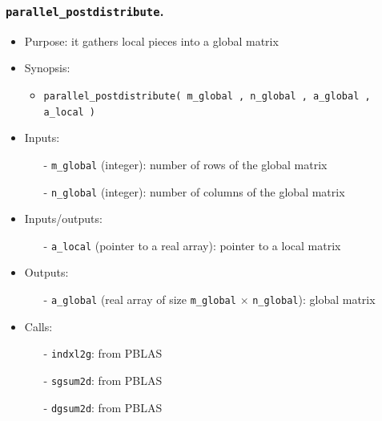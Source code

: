 \documentclass[12pt]{article}
\begin{document}
\subsubsection{{\tt parallel\_postdistribute}.}
\begin{itemize}
\item Purpose: it gathers local pieces into a global matrix
\item Synopsis: 
\begin{itemize}
\item {\tt parallel\_postdistribute( m\_global , n\_global , a\_global , a\_local )}
\end{itemize}
\item Inputs: 
\begin{itemize}
\item[-] {\tt m\_global} (integer): number of rows of the global matrix
\item[-] {\tt n\_global} (integer): number of columns of the global matrix
\end{itemize}
\item Inputs/outputs: 
\begin{itemize}
\item[-] {\tt a\_local} (pointer to a real array): pointer to a local matrix
\end{itemize}
\item Outputs: 
\begin{itemize}
\item[-] {\tt a\_global} (real array of size {\tt m\_global} $\times$ {\tt n\_global}): global matrix
\end{itemize}
\item Calls: 
\begin{itemize}
\item[-] {\tt indxl2g}: from PBLAS
\item[-] {\tt sgsum2d}: from PBLAS
\item[-] {\tt dgsum2d}: from PBLAS
\end{itemize}
\end{itemize} 
\end{document}
